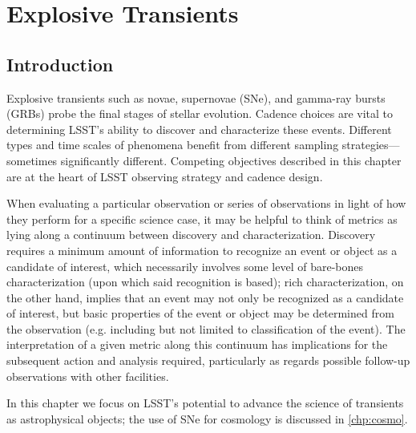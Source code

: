 
\chapter[Explosive Transients]{Explosive Transients}
\def\chpname{transients}\label{chp:\chpname}



\section{Introduction}

Explosive transients such as novae, supernovae (SNe), and gamma-ray bursts (GRBs) probe the final stages of stellar evolution.
Cadence choices are vital to determining LSST's ability to discover and characterize these events.
Different types and time scales of phenomena benefit from different sampling strategies---sometimes significantly different.  Competing objectives described in this chapter are at the heart of LSST observing strategy and cadence design.

When evaluating a particular observation or series of observations in light of how they perform for a specific science case, it may be helpful to think of metrics as lying along a continuum between discovery and characterization. Discovery requires a minimum amount of information to recognize an event or object as a candidate of interest, which necessarily involves some level of bare-bones characterization (upon which said recognition is based); rich characterization, on the other hand, implies that an event may not only be recognized as a candidate of interest, but basic properties of the event or object may be determined from the observation (e.g. including but not limited to classification of the event). The interpretation of a given metric along this continuum has implications for the subsequent action and analysis required, particularly as regards possible follow-up observations with other facilities. 

In this chapter we focus on LSST's potential to advance the science of transients as astrophysical objects; the use of SNe for cosmology is discussed in \autoref{chp:cosmo}.


